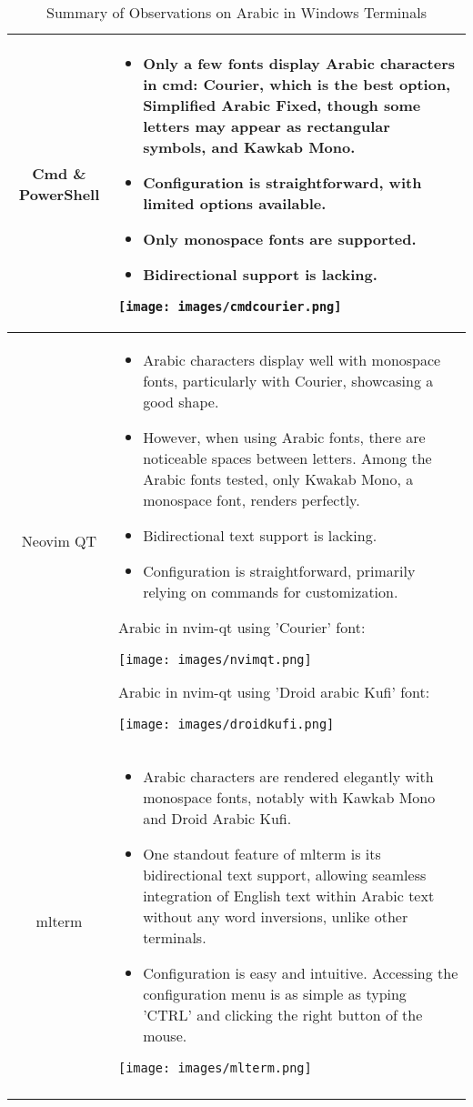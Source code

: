 \documentclass[12pt, letterpaper]{article}
\begin{document}
\begin{longtable}{|c|p{10cm}|}
\\
    \hline
    \centering Cmd \& PowerShell &
    \begin{itemize}
        \item Only a few fonts display Arabic characters in cmd: Courier, which is the best option, Simplified Arabic Fixed, though some letters may appear as rectangular symbols, and Kawkab Mono.
        \item Configuration is straightforward, with limited options available.
        \item Only monospace fonts are supported.
        \item Bidirectional support is lacking.
    \end{itemize} 
    \texttt{[image: images/cmdcourier.png]}

\\
    \hline
    Neovim QT &
    \begin{itemize}
        \item Arabic characters display well with monospace fonts, particularly with Courier, showcasing a good shape.
        \item However, when using Arabic fonts, there are noticeable spaces between letters. Among the Arabic fonts tested, only Kwakab Mono, a monospace font, renders perfectly.
        \item Bidirectional text support is lacking.
        \item Configuration is straightforward, primarily relying on commands for customization.
    \end{itemize}

    Arabic in nvim-qt using 'Courier' font:\newline

    \texttt{[image: images/nvimqt.png]}

    Arabic in nvim-qt using 'Droid arabic Kufi' font:\newline

  \texttt{[image: images/droidkufi.png]}

    \\
    \hline
    mlterm &
    \begin{itemize}
        \item Arabic characters are rendered elegantly with monospace fonts, notably with Kawkab Mono and Droid Arabic Kufi.
        \item One standout feature of mlterm is its bidirectional text support, allowing seamless integration of English text within Arabic text without any word inversions, unlike other terminals.
        \item Configuration is easy and intuitive. Accessing the configuration menu is as simple as typing 'CTRL' and clicking the right button of the mouse.
    \end{itemize}

    \texttt{[image: images/mlterm.png]}

    \\
    \hline
    
    \caption{Summary of Observations on Arabic in Windows Terminals}
    \label{tab:observations}
\end{longtable}
\end{document}
